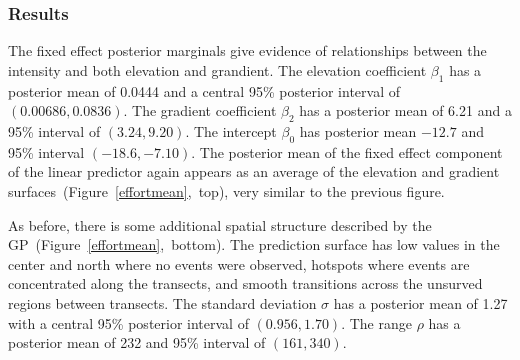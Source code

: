\documentclass[]{interact}
\begin{document}
\subsubsection{Results}
\label{xsectresults}

The fixed effect posterior marginals give evidence of relationships between
the intensity and both elevation and grandient. The elevation coefficient
\(\beta_{1}\) has a posterior mean of 0.0444 and a central 95\% posterior
interval of \((0.00686, 0.0836)\). The gradient coefficient \(\beta_{2}\) has
a posterior mean of 6.21 and a 95\% interval of \((3.24, 9.20)\). The
intercept \(\beta_{0}\) has posterior mean \(-12.7\) and 95\% interval
\((-18.6, -7.10)\). The posterior mean of the fixed effect component of the
linear predictor again appears as an average of the elevation and gradient
surfaces~(Figure~\ref{effortmean},~top), very similar to the previous figure.

As before, there is some additional spatial structure described by the
GP~(Figure~\ref{effortmean},~bottom). The prediction surface has low values
in the center and north where no events were observed, hotspots where events
are concentrated along the transects, and smooth transitions across the
unsurved regions between transects. The standard deviation \(\sigma\) has a
posterior mean of 1.27 with a central 95\% posterior interval of
\((0.956, 1.70)\). The range \(\rho\) has a posterior mean of 232 and
95\% interval of \((161, 340)\).
\end{document}
